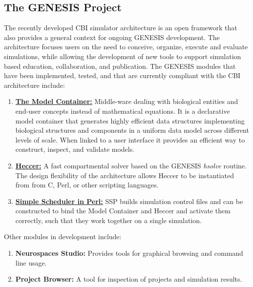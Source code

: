 \documentclass[12pt]{article}
\begin{document}
\subsection*{The GENESIS Project}

The recently developed CBI simulator architecture is an open framework that also provides a general context for ongoing GENESIS development. The architecture focuses users on the need to conceive, organize, execute and evaluate simulations, while allowing the development of new tools to support simulation based education, collaboration, and publication. The GENESIS modules that have been implemented, tested, and that are currently compliant with the CBI architecture include:

\begin{enumerate}
\item \href{../document-model-container/document-model-container.tex}{\bf The Model Container:} Middle-ware dealing with biological entities and end-user concepts instead of mathematical equations. It is a declarative model container that generates highly efficient data structures implementing biological structures and components in a uniform data model across different levels of scale. When linked to a user interface it provides an efficient way to construct, inspect, and validate models.

\item \href{../document-heccer/document-heccer.tex}{\bf Heccer:} A fast compartmental solver based on the GENESIS {\it hsolve} routine. The design flexibility of the architecture allows Heccer to be instantiated from from C, Perl, or other scripting languages.

\item \href{../document-ssp/document-ssp.tex}{\bf Simple Scheduler in Perl:} SSP builds simulation control files and can be constructed to bind the Model Container and Heccer and activate them correctly, such that they work together on a single simulation.
\end{enumerate}

\noindent Other modules in development include:

\begin{enumerate}
\item {\bf Neurospaces Studio:} Provides tools for graphical browsing and command line usage.
\item {\bf Project Browser:} A tool for inspection of projects and simulation results.
\end{enumerate}
\end{document}
